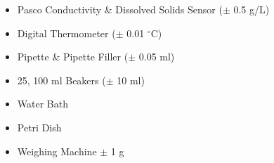 \begin{itemize}
    \item {Pasco Conductivity \& Dissolved Solids Sensor ($\pm$ 0.5 g/L)}
    \item {Digital Thermometer ($\pm$ 0.01 $^\circ$C)}
    \item {Pipette \& Pipette Filler ($\pm$ 0.05 ml)}
    \item {25, 100 ml Beakers ($\pm$ 10 ml)}
    \item {Water Bath}
    \item {Petri Dish}
    \item {Weighing Machine $\pm$ 1 g}
    \label{app}
\end{itemize}

